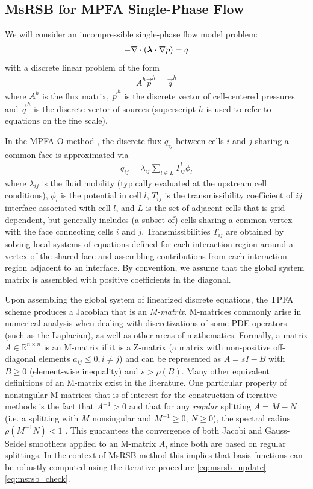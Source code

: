 \subsection{MsRSB for MPFA Single-Phase Flow}
\label{subsec:enhanced_msrsb_flow}

We will consider an incompressible single-phase flow model problem:
\begin{align}
    - \nabla \cdot \left(\bm{\lambda} \cdot \nabla p\right) = q
\end{align}
with a discrete linear problem of the form
\begin{align}
    A^h\vec{p}^h = \vec{q}^h
\end{align}
where $A^h$ is the flux matrix, $\vec{p}^h$ is the discrete vector of cell-centered pressures and $\vec{q}^h$ is the discrete vector of sources (superscript $h$ is used to refer to equations on the fine scale).

In the MPFA-O method \cite{Aavatsmark2002}, the discrete flux $q_{ij}$ between cells $i$ and $j$ sharing a common face is approximated via
\begin{align}
    q_{ij} = \lambda_{ij}\sum\limits_{l \in L} T_{ij}^l \phi_l
\end{align}
where $\lambda_{ij}$ is the fluid mobility (typically evaluated at the upstream cell conditions), $\phi_l$ is the potential in cell $l$, $T_{ij}^l$ is the transmissibility coefficient of $ij$ interface associated with cell $l$, and $L$ is the set of adjacent cells that is grid-dependent, but generally includes (a subset of) cells sharing a common vertex with the face connecting cells $i$ and $j$.   Transmissibilities $T_{ij}$ are obtained by solving local systems of equations defined for each interaction region around a vertex of the shared face and assembling contributions from each interaction region adjacent to an interface.   By convention, we assume that the global system matrix is assembled with positive coefficients in the diagonal.

Upon assembling the global system of linearized discrete equations, the TPFA scheme produces a Jacobian that is an \textit{M-matrix}.   M-matrices commonly arise in numerical analysis when dealing with discretizations of some PDE operators (such as the Laplacian), as well as other areas of mathematics.   Formally, a matrix $A \in \mathbb{R}^{n \times n}$ is an M-matrix if it is a Z-matrix (a matrix with non-positive off-diagonal elements $a_{ij} \leq 0, i \neq j$) and can be represented as $A = sI - B$ with $B \geq 0$ (element-wise inequality) and $s > \rho(B)$.   Many other equivalent definitions of an M-matrix exist in the literature.   One particular property of nonsingular M-matrices that is of interest for the construction of iterative methods is the fact that $A^{-1} > 0$ and that for any \textit{regular} splitting $A = M - N$ (i.e. a splitting with $M$ nonsingular and $M^{-1} \geq 0$, $N \geq 0$), the spectral radius $\rho(M^{-1}N) < 1$ \cite{Saad2003}.   This guarantees the convergence of both Jacobi and Gauss-Seidel smoothers applied to an M-matrix $A$, since both are based on regular splittings.   In the context of MsRSB method this implies that basis functions can be robustly computed using the iterative procedure \eqref{eq:msrsb_update}-\eqref{eq:msrsb_check}.

